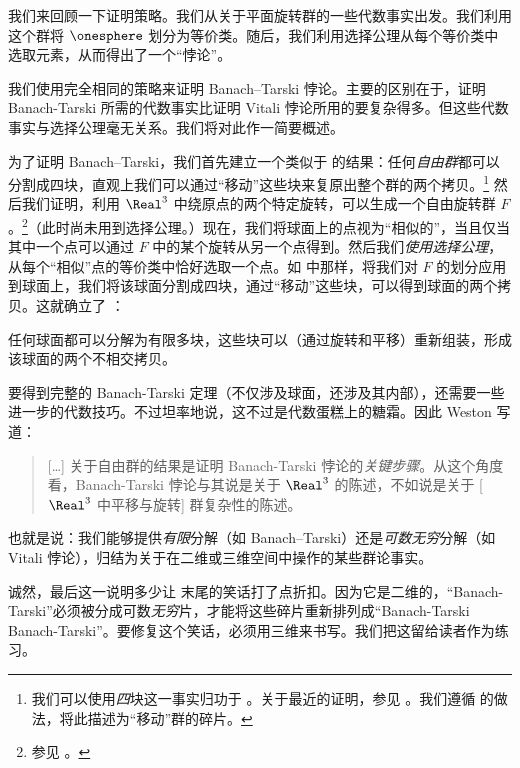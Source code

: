 \documentclass[../../../include/open-logic-section]{subfiles}
\begin{document}
我们来回顾一下证明策略。我们从关于平面旋转群的一些代数事实出发。我们利用这个群将 $\onesphere$ 划分为等价类。随后，我们利用选择公理从每个等价类中选取元素，从而得出了一个“悖论”。

我们使用完全相同的策略来证明 Banach--Tarski 悖论。主要的区别在于，证明 Banach-Tarski 所需的代数事实比证明 Vitali 悖论所用的要复杂得多。但这些代数事实与选择公理毫无关系。我们将对此作一简要概述。

为了证明 Banach--Tarski，我们首先建立一个类似于  的结果：任何\emph{自由群}都可以分割成四块，直观上我们可以通过“移动”这些块来复原出整个群的两个拷贝。\footnote{我们可以使用\emph{四}块这一事实归功于 \cite{Robinson1947}。关于最近的证明，参见 \citet[Theorem 5.2]{Wagon2016}。我们遵循 \citet[p.~3]{Weston2003} 的做法，将此描述为“移动”群的碎片。} 然后我们证明，利用 $\Real^3$ 中绕原点的两个特定旋转，可以生成一个自由旋转群 $F$。\footnote{参见 \citet[Theorem 2.1]{Wagon2016}。}（此时尚未用到选择公理。）现在，我们将球面上的点视为“相似的”，当且仅当其中一个点可以通过 $F$ 中的某个旋转从另一个点得到。然后我们\emph{使用选择公理}，从每个“相似”点的等价类中恰好选取一个点。如  中那样，将我们对 $F$ 的划分应用到球面上，我们将该球面分割成四块，通过“移动”这些块，可以得到球面的两个拷贝。这就确立了 \citep{Hausdorff1914}：

\begin{thm}[Hausdorff悖论]
任何球面都可以分解为有限多块，这些块可以（通过旋转和平移）重新组装，形成该球面的两个不相交拷贝。
\end{thm}


要得到完整的 Banach-Tarski 定理（不仅涉及球面，还涉及其内部），还需要一些进一步的代数技巧。不过坦率地说，这不过是代数蛋糕上的糖霜。因此 Weston 写道：

\begin{quote}
  [\ldots] 关于自由群的结果是证明 Banach-Tarski 悖论的\emph{关键步骤}。从这个角度看，Banach-Tarski 悖论与其说是关于 $\Real^3$ 的陈述，不如说是关于 [$\Real^3$ 中平移与旋转] 群复杂性的陈述。\cite[p.~16]{Weston2003}
\end{quote}

也就是说：我们能够提供\emph{有限}分解（如 Banach--Tarski）还是\emph{可数无穷}分解（如 Vitali 悖论），归结为关于在二维或三维空间中操作的某些群论事实。

诚然，最后这一说明多少让  末尾的笑话打了点折扣。因为它是二维的，“Banach-Tarski”必须被分成可数\emph{无穷}片，才能将这些碎片重新排列成“Banach-Tarski Banach-Tarski”。要修复这个笑话，必须用三维来书写。我们把这留给读者作为练习。
\end{document}
